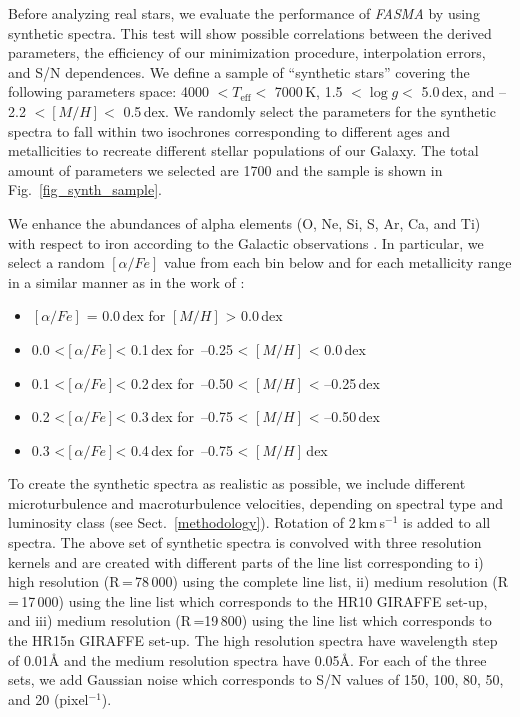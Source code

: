 \documentclass[fleqn,usenatbib]{mnras}
\begin{document}


Before analyzing real stars, we evaluate the performance of \textit{FASMA} by using synthetic spectra. This test will show possible correlations between the derived parameters, 
the efficiency of our minimization procedure, interpolation errors, and S/N dependences. We define a sample of ``synthetic stars'' covering the following parameters space: 
4000 $< T_{\mathrm{eff}} <$ 7000\,K, 1.5 $< \log g <$ 5.0\,dex, and --2.2 $< [M/H] <$ 0.5\,dex. We randomly select the parameters for the synthetic spectra to fall within two isochrones 
\cite[PARSEC isochrones;][]{bressen2012} corresponding to different ages and metallicities to recreate different stellar populations of our Galaxy. The total amount of parameters we selected 
are 1700 and the sample is shown in Fig.~\ref{fig_synth_sample}.

We enhance the abundances of alpha elements (O, Ne, Si, S, Ar, Ca, and Ti) with respect to iron according to the Galactic observations \cite[e.g.][]{Adibekyan2011}. 
In particular, we select a random $[\alpha/Fe]$ value from each bin below and for each metallicity range in a similar manner as in the work of \cite{Kordopatis2011}: 
\begin{itemize}
 \item $[\alpha/Fe]$ = 0.0\,dex     for $[M/H]$ > 0.0\,dex 
 \item 0.0 <$[\alpha/Fe]$< 0.1\,dex for \,--0.25 < $[M/H]$ < 0.0\,dex 
 \item 0.1 <$[\alpha/Fe]$< 0.2\,dex for \,--0.50 < $[M/H]$ < --0.25\,dex 
 \item 0.2 <$[\alpha/Fe]$< 0.3\,dex for \,--0.75 < $[M/H]$ < --0.50\,dex 
 \item 0.3 <$[\alpha/Fe]$< 0.4\,dex for \,--0.75 < $[M/H]$\,dex  
\end{itemize}

To create the synthetic spectra as realistic as possible, we include different microturbulence and macroturbulence velocities, depending on spectral type and luminosity class 
(see Sect.~\ref{methodology}). Rotation of 2\,km\,s$^{-1}$ is added to all spectra. The above set of synthetic spectra is convolved with three resolution kernels and are created with different 
parts of the line list corresponding to i) high resolution (R\,=\,78\,000) using the complete line list, ii) medium resolution (R\,=\,17\,000) using the line list which corresponds to the 
HR10 GIRAFFE set-up, and iii) medium resolution (R\,=19\,800) using the line list which corresponds to the HR15n GIRAFFE set-up. The high resolution spectra have wavelength step of 0.01\AA{} 
and the medium resolution spectra have 0.05\AA{}. For each of the three sets, we add Gaussian noise which corresponds to S/N values of 150, 100, 80, 50, and 20 (pixel$^{-1}$). 
\end{document}
